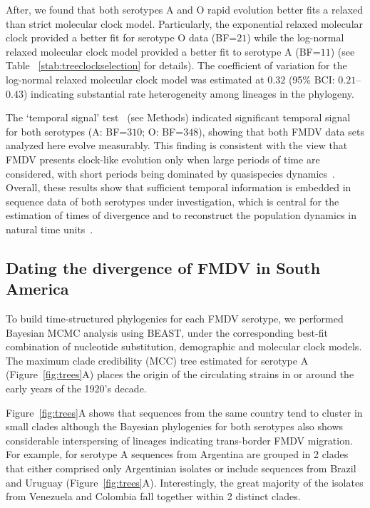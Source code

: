 \documentclass[10pt]{article}
\begin{document}
After, we found that both serotypes A and O rapid evolution better fits a relaxed than strict molecular clock model.
Particularly, the exponential relaxed molecular clock provided a better fit for serotype O data (BF=$21$) while the log-normal relaxed molecular clock model provided a better fit to serotype A (BF=$11$) (see Table ~\ref{stab:treeclockselection} for details). 
The coefficient of variation for the log-normal relaxed molecular clock model was estimated at $0.32$ (95\% BCI: $ 0.21$--$0.43$) indicating substantial rate heterogeneity among lineages in the phylogeny. 

The  `temporal signal' test~\cite{Faria2012} (see Methods) indicated significant temporal signal for both serotypes (A: BF=$310$; O: BF=$348$), showing that both FMDV data sets analyzed here evolve measurably.
This finding is consistent with the view that FMDV presents clock-like evolution only when large periods of time are considered, with short periods being dominated by quasispecies dynamics~\cite{Muellner2011}.
Overall, these results show that sufficient temporal information is embedded in sequence data of both serotypes under investigation, which is central for the estimation of times of divergence and to reconstruct the population dynamics in natural time units~\cite{MEP}.

\subsection*{Dating the divergence of FMDV in South America}

To build time-structured phylogenies for each FMDV serotype, we performed Bayesian MCMC analysis using BEAST, under the corresponding best-fit combination of nucleotide substitution, demographic and molecular clock models.
The maximum clade credibility (MCC) tree estimated for serotype A (Figure~\ref{fig:trees}A) places the origin of the circulating strains in or around the early years of the 1920's decade.

Figure~\ref{fig:trees}A shows that sequences from the same country tend to cluster in small clades although the Bayesian phylogenies for both serotypes also shows considerable interspersing of lineages indicating trans-border FMDV migration.
For example, for serotype A sequences from Argentina are grouped in 2 clades that either comprised only Argentinian isolates or include sequences from Brazil and Uruguay (Figure~\ref{fig:trees}A).
Interestingly, the great majority of the isolates from Venezuela and Colombia fall together within 2 distinct clades. 
\end{document}
